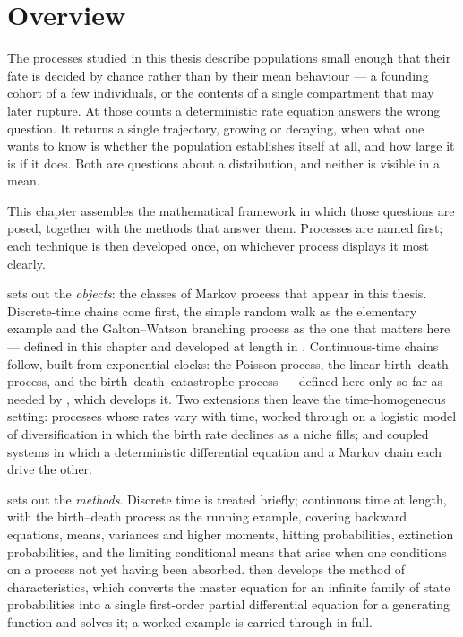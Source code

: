 \section{Overview}
\label{m:sec:overview}

The processes studied in this thesis describe populations small enough that their
fate is decided by chance rather than by their mean behaviour --- a founding cohort
of a few individuals, or the contents of a single compartment that may later
rupture. At those counts a deterministic rate equation answers the wrong question.
It returns a single trajectory, growing or decaying, when what one wants to know is
whether the population establishes itself at all, and how large it is if it does.
Both are questions about a distribution, and neither is visible in a mean.

This chapter assembles the mathematical framework in which those questions are
posed, together with the methods that answer them. Processes are named first; each
technique is then developed once, on whichever process displays it most clearly.

 sets out the \emph{objects}: the classes of Markov process that
appear in this thesis. Discrete-time chains come first, the simple random walk as
the elementary example and the Galton--Watson branching process as the one that
matters here --- defined in this chapter and developed at length in \ChA.
Continuous-time chains follow, built from exponential clocks: the
Poisson process, the linear birth--death process, and the
birth--death--catastrophe process --- defined here only so far as needed by
, which develops
it. Two extensions then leave the time-homogeneous
setting: processes whose rates vary with time, worked through on a logistic model
of diversification in which the birth rate declines as a niche fills; and coupled
systems in which a deterministic differential equation and a Markov chain each
drive the other.

 sets out the \emph{methods}. Discrete time is treated briefly;
continuous time at length, with the birth--death process as the running example,
covering backward equations, means, variances and higher moments, hitting
probabilities, extinction probabilities, and the limiting conditional means that
arise when one conditions on a process not yet having been absorbed.
 then develops the method of characteristics, which converts the
master equation for an infinite family of state probabilities into a single
first-order partial differential equation for a generating function and solves it;
a worked example is carried through in full.


